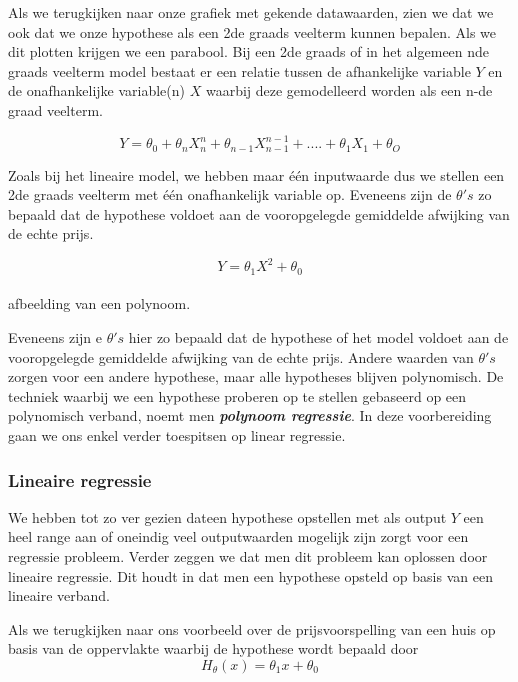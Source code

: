 Als we terugkijken naar onze grafiek met gekende datawaarden, zien we dat we ook dat we onze hypothese als een 2de graads veelterm kunnen bepalen. Als we dit plotten krijgen we een parabool. Bij een 2de graads of in het algemeen nde graads veelterm model bestaat er een relatie tussen de afhankelijke variable $Y$ en de onafhankelijke variable(n) $X$ waarbij deze gemodelleerd worden als een n-de graad veelterm.

\[Y = \theta_{0} + \theta_{n}X^{n}_{n} + \theta_{n-1}X^{n-1}_{n-1} + .... +  \theta_{1}X_{1} + \theta_{O} \]

Zoals bij het lineaire model, we hebben maar \'e\'en inputwaarde dus we stellen een 2de graads veelterm met \'e\'en onafhankelijk variable op.
Eveneens zijn de $\theta's$ zo bepaald dat de hypothese voldoet aan de vooropgelegde gemiddelde afwijking van de echte prijs.  

\[Y = \theta_{1}X^{2} + \theta_{0}\]\\ afbeelding van een polynoom.

Eveneens zijn e $\theta's$ hier zo bepaald dat de hypothese of het model voldoet aan de vooropgelegde gemiddelde afwijking van de echte prijs. Andere waarden van $\theta's$ zorgen voor een andere  hypothese, maar alle hypotheses blijven polynomisch. De techniek waarbij we een hypothese proberen op te stellen gebaseerd op een polynomisch verband, noemt men \textbf{\textit{polynoom regressie}}. 
\newline
In deze voorbereiding gaan we ons enkel verder toespitsen op linear regressie. 

\subsubsection{Lineaire regressie}\label{lineaire regressie}

We hebben tot zo ver gezien dateen hypothese opstellen met als output $Y$ een heel range aan of oneindig veel outputwaarden mogelijk zijn zorgt voor een regressie probleem. Verder zeggen we dat men dit probleem kan oplossen door lineaire regressie. Dit houdt in dat men een hypothese opsteld op basis van een lineaire verband.

Als we terugkijken naar ons voorbeeld over de prijsvoorspelling van een huis op basis van de oppervlakte waarbij de hypothese wordt bepaald door
\newline
\[H_{\theta}(x) = \theta_{1}x + \theta_{0}\]
\newline

